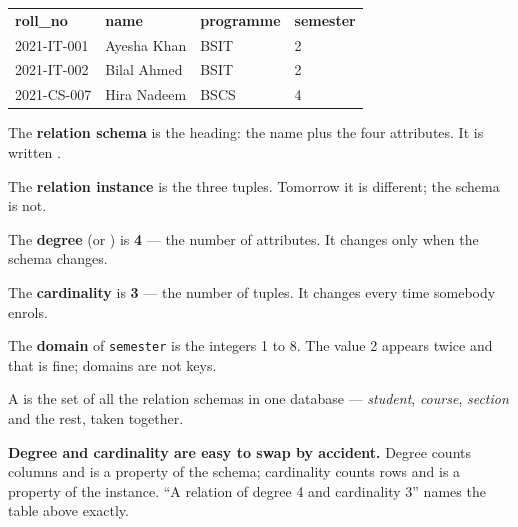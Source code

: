 \begin{examplebox}

\medskip
\begin{tabular}{@{}L{3.2cm}L{3.0cm}L{2.4cm}L{2.2cm}@{}}
\textbf{roll\_no} & \textbf{name} & \textbf{programme} & \textbf{semester} \\
2021-IT-001 & Ayesha Khan & BSIT & 2 \\
2021-IT-002 & Bilal Ahmed & BSIT & 2 \\
2021-CS-007 & Hira Nadeem & BSCS & 4 \\
\end{tabular}

\medskip
\begin{tight}
  \item The \textbf{relation schema} is the heading: the name plus the four
        attributes. It is written .
  \item The \textbf{relation instance} is the three tuples. Tomorrow it is
        different; the schema is not.
  \item The \textbf{degree} (or ) is \textbf{4} --- the number of
        attributes. It changes only when the schema changes.
  \item The \textbf{cardinality} is \textbf{3} --- the number of tuples. It
        changes every time somebody enrols.
  \item The \textbf{domain} of \texttt{semester} is the integers 1 to 8. The
        value 2 appears twice and that is fine; domains are not keys.
\end{tight}

\smallskip
A  is the set of all the relation
schemas in one database --- \textit{student}, \textit{course},
\textit{section} and the rest, taken together.

\smallskip
\textbf{Degree and cardinality are easy to swap by accident.} Degree counts
columns and is a property of the schema; cardinality counts rows and is a
property of the instance. ``A relation of degree 4 and cardinality 3'' names
the table above exactly.
\end{examplebox}

